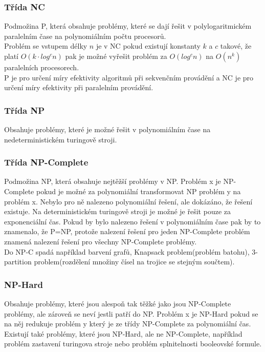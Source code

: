 \subsubsection{Třída NC}
Podmožina P, která obsahuje problémy, které se dají řešit v polylogaritmickém paralelním čase na polynomiálním počtu procesorů.\\
Problém se vstupem délky \(n\) je v NC pokud existují konstanty \(k\) a \(c\) takové, že platí \(O(k \cdot log^cn)\) pak je možné vyřešit problém za \(O(log^cn)\)
na \(O(n^k)\) paralelních procesorech.\\
P je pro určení míry efektivity algoritmů při sekvenčním provádění a NC je pro určení míry efektivity při paralelním provádění.

\subsubsection{Třída NP}
Obsahuje problémy, které je možné řešit v polynomiálním čase na nedeterministickém turingově stroji.\\
\subsubsection{Třída NP-Complete}
Podmožina NP, která obsahuje nejtěžší problémy v NP. Problém x je NP-Complete pokud je možné za polynomiální transformovat NP problém y na
problém x. Nebylo pro ně nalezeno polynomiální řešení, ale dokázáno, že řešení existuje. Na deterministickém turingově stroji je možné je řešit pouze za
exponenciální čas. Pokud by bylo nalezeno řešení v polynomiálním čase pak by to znamenalo, že P=NP, protože nalezení řešení pro jeden NP-Complete problém
znamená nalezení řešení pro všechny NP-Complete problémy.\\
Do NP-C spadá například barvení grafů, Knapsack problem(problém batohu), 3-partition problem(rozdělení množiny čísel na trojice se stejným součtem).

\subsubsection{NP-Hard}
Obsahuje problémy, které jsou alespoň tak těžké jako jsou NP-Complete problémy, ale zároveň se neví jestli patří do NP. Problém x je NP-Hard pokud se na něj
redukuje problém y který je ze třídy NP-Complete za polynomiální čas. Existují také problémy, které jsou NP-Hard, ale ne NP-Complete,
například problém zastavení turingova stroje nebo problém splnitelnosti booleovské formule.

